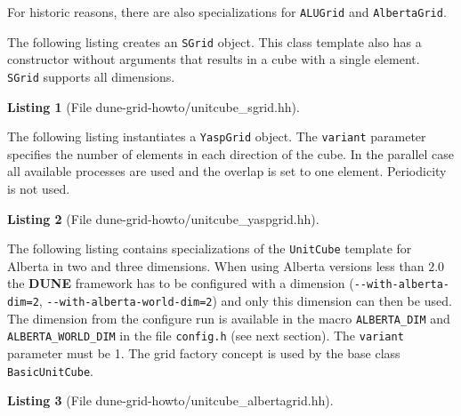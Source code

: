 \documentclass[11pt,a4paper,headinclude,footinclude,DIV16,normalheadings]{scrreprt}
\newcommand{\Dune}{{\sf\bfseries DUNE}\xspace}
\newtheorem{lst}{Listing}
\begin{document}
For historic reasons, there are also specializations for 
\lstinline!ALUGrid! and \lstinline!AlbertaGrid!.


The following listing creates an \lstinline!SGrid! object. This class
template also has a constructor without arguments that results in a
cube with a single element. \lstinline!SGrid! supports all dimensions.

\begin{lst}[File dune-grid-howto/unitcube\_sgrid.hh] \mbox{}
\nopagebreak

\end{lst}


The following listing instantiates a \lstinline!YaspGrid! object. The
\lstinline!variant! parameter specifies the number of elements in each
direction of the cube. In the parallel case all available processes
are used and the overlap is set to one element. Periodicity is not
used.  

\begin{lst}[File dune-grid-howto/unitcube\_yaspgrid.hh] \mbox{}
\nopagebreak

\end{lst}


The following listing contains specializations of the
\lstinline!UnitCube! template for Alberta in two and three
dimensions. When using Alberta versions less than $2.0$ the \Dune{} framework
has to be configured with a dimension (\lstinline!--with-alberta-dim=2!,
\lstinline!--with-alberta-world-dim=2!) and only this dimension can then be
used. 
The dimension from the configure run is available in the macro
\lstinline!ALBERTA_DIM! and \lstinline!ALBERTA_WORLD_DIM! 
in the file \lstinline!config.h! (see
next section). The \lstinline!variant! parameter must be 1.
The grid factory concept is used by the base class \lstinline!BasicUnitCube!.

\begin{lst}[File dune-grid-howto/unitcube\_albertagrid.hh] \mbox{}
\nopagebreak

\end{lst}

\end{document}
